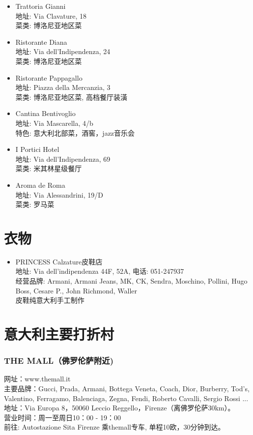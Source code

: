 \begin{multicols}{2}
\begin{itemize}
\item Trattoria Gianni\\
地址: Via Clavature, 18\\
菜类: 博洛尼亚地区菜

\item Ristorante Diana\\
地址: Via dell'Indipendenza, 24\\
菜类: 博洛尼亚地区菜

\item Ristorante Pappagallo\\
地址: Piazza della Mercanzia, 3\\
菜类: 博洛尼亚地区菜, 高档餐厅装潢

\item Cantina Bentivoglio\\
地址: Via Mascarella, 4/b\\
特色: 意大利北部菜，酒窖，jazz音乐会

\item I Portici Hotel\\
地址: Via dell'Indipendenza, 69\\
菜类: 米其林星级餐厅

\item Aroma de Roma\\
地址: Via Alessandrini, 19/D\\
菜类: 罗马菜
\end{itemize}


\section{衣物}
\begin{itemize}
\item PRINCESS Calzature皮鞋店\\
地址: Via dell'indipendenza 44F, 52A, 电话: 051-247937\\
经营品牌: Armani, Armani Jeans, MK, CK, Sendra, Moschino, Pollini, Hugo Boss, Cesare P., John Richmond, Waller\\
皮鞋纯意大利手工制作
\end{itemize}

\section{意大利主要打折村}

\subsubsection{THE MALL（佛罗伦萨附近)}
\noindent 网址：www.themall.it\\
主要品牌：Gucci, Prada, Armani, Bottega Veneta, Coach, Dior, Burberry, Tod’s, Valentino, Ferragamo, Balenciaga, Zegna, Fendi, Roberto Cavalli, Sergio Rossi ...\\
地址：Via Europa 8，50060 Leccio Reggello，Firenze（离佛罗伦萨30km）。\\
营业时间：周一至周日10：00 - 19：00 \\
前往: Autostazione Sita Firenze 乘themall专车, 单程10欧，30分钟到达。


\end{multicols}

